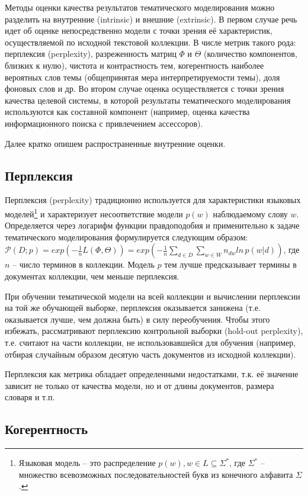 Методы оценки качества результатов тематического моделирования можно разделить на внутренние (intrinsic) и внешние (extrinsic). В первом случае речь идет об оценке непосредственно модели с точки зрения её характеристик, осуществляемой по исходной текстовой коллекции. В числе метрик такого рода: перплексия (perplexity), разреженность матриц $\Phi$ и $\Theta$ (количество компонентов, близких к нулю), чистота и контрастность тем, когерентность наиболее вероятных слов темы (общепринятая мера интерпретируемости темы), доля фоновых слов и др. Во втором случае оценка осуществляется с точки зрения качества целевой системы, в которой результаты тематического моделирования используются как составной компонент (например, оценка качества информационного поиска с привлечением ассессоров).

Далее кратко опишем распространенные внутренние оценки.

\subsection*{Перплексия}

Перплексия (perplexity) традиционно используется для характеристики языковых моделей\footnote{Языковая модель -- это распределение $p(w), w \in L \subseteq \Sigma^*$, где $\Sigma^*$ -- множество всевозможных последовательностей букв из конечного алфавита $\Sigma$.}
и характеризует несоответствие модели $p(w)$ наблюдаемому слову $w$. Определяется через логарифм функции правдоподобия и применительно к задаче тематического моделирования формулируется следующим образом: $\mathcal{P}(D; p) = exp(-\frac{1}{n}L(\Phi, \Theta)) = exp(-\frac{1}{n}\sum_{d \in D}\sum_{w \in W}n_{dw}ln\,p(w|d))$, где $n$ -- число терминов в коллекции. Модель $p$ тем лучше предсказывает термины в документах коллекции, чем меньше перплексия.

При обучении тематической модели на всей коллекции и вычислении перплексии на той же обучающей выборке, перплексия оказывается занижена (т.е. оказывается лучше, чем должна быть) в силу переобучения. Чтобы этого избежать, рассматривают перплексию контрольной выборки (hold-out perplexity), т.е. считают на части коллекции, не использовавшейся для обучения (например, отбирая случайным образом десятую часть документов из исходной коллекции).

Перплексия как метрика обладает определенными недостатками, т.к. её значение зависит не только от качества модели, но и от длины документов, размера словаря и т.п.

\subsection*{Когерентность}

